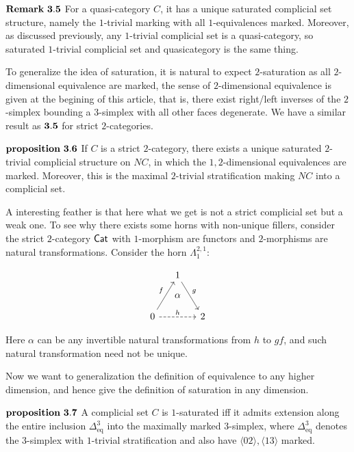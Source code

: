 \documentclass[11pt]{article}
\DeclareMathOperator{\eq}{eq}
\begin{document}
$\bf Remark \ 3.5$ For a quasi-category $C$, it has a unique saturated complicial set structure, namely the $1$-trivial marking with all $1$-equivalences marked. Moreover, as discussed previously, any $1$-trivial complicial set is a quasi-category, so saturated $1$-trivial complicial set and quasicategory is the same thing.


To generalize the idea of saturation, it is natural to expect $2$-saturation as all $2$-dimensional equivalence are marked, the sense of $2$-dimensional equivalence is given at the begining of this article, that is, there exist right/left inverses of the $2$-simplex bounding a $3$-simplex with all other faces degenerate. We have a similar result as $\bf 3.5$ for strict $2$-categories.

$\bf proposition \ 3.6$ If $C$ is a strict $2$-category, there exists a unique saturated $2$-trivial complicial structure on $NC$, in which the $1,2$-dimensional equivalences are marked. Moreover, this is the maximal $2$-trivial stratification making $NC$ into a complicial set.

A interesting feather is that here what we get is not a strict complicial set but a weak one. To see why there exists some horns with non-unique fillers, consider the strict $2$-category $\sf Cat$ with $1$-morphism are functors and $2$-morphisms are natural transformations. Consider the horn $\Lambda^{2,1}_1$:

  \begin{equation*}
\begin{tikzcd}[column sep=small, row sep=small]
& 1 \arrow{rdd}{g} \\
& \alpha \\
0 \arrow{uur}{f} \arrow[dashed]{rr}{h} &  & 2
\end{tikzcd}
\end{equation*}

Here $\alpha$ can be any invertible natural transformations from $h$ to $gf$, and such natural transformation need not be unique.

Now we want to generalization the definition of equivalence to any higher dimension, and hence give the definition of saturation in any dimension.

$\bf proposition \ 3.7$ A complicial set $C$ is $1$-saturated iff it admits extension along the entire inclusion $\Delta^3_{\eq}$ into the maximally marked $3$-simplex, where  $\Delta^3_{\eq}$ denotes the $3$-simplex with $1$-trivial stratification and also have $\langle 02\rangle,\langle 13\rangle$ marked.
\end{document}
